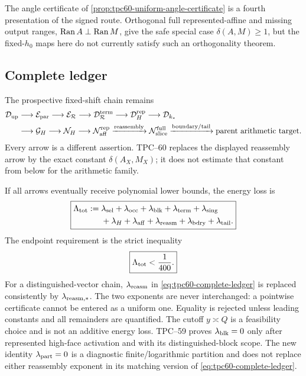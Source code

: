 The angle certificate of
\cref{prop:tpc60-uniform-angle-certificate} is a fourth presentation of the
 signed route.  Orthogonal full represented-affine and missing output
 ranges, \(\operatorname{Ran} A\perp\operatorname{Ran} M\), give the
safe special case \(\delta(A,M)\ge1\), but the fixed-\(h_0\) maps here do
not currently satisfy such an orthogonality theorem.

\subsection{Complete ledger}

The prospective fixed-shift chain remains
\begin{equation}
 \begin{aligned}
 \mathcal D_{\rm up}
 &\longrightarrow\mathcal E_{\rm par}
 \longrightarrow\mathcal E_{\mathcal R}
 \longrightarrow\mathcal D_{\mathcal R}^{\rm term}
 \longrightarrow\mathcal D_H^{\rm rep}
 \longrightarrow\mathcal D_{k_*}\\
 &\longrightarrow\mathcal G_H
 \longrightarrow\mathcal N_H
 \longrightarrow\mathcal N_{\rm aff}^{\rm rep}
 \xrightarrow{\rm reassembly}
 \mathcal N_{\rm slice}^{\rm full}
 \xrightarrow{\rm boundary/tail}
 \text{parent arithmetic target}.
 \end{aligned}
 \label{eq:tpc60-full-transfer-chain}
\end{equation}
Every arrow is a different assertion.  TPC--60 replaces the displayed
reassembly arrow by the exact constant \(\delta(A_X,M_X)\); it does not
estimate that constant from below for the arithmetic family.

If all arrows eventually receive polynomial lower bounds, the energy loss
is
\begin{equation}
 \boxed{
 \begin{aligned}
 \Lambda_{\rm tot}:={}&
 \lambda_{\rm sel}+\lambda_{\rm occ}
 +\lambda_{\rm blk}
 +\lambda_{\rm term}+\lambda_{\rm sing}\\
 &+\lambda_H+\lambda_{\rm aff}
 +\lambda_{\rm reasm}
 +\lambda_{\rm bdry}+\lambda_{\rm tail}.
 \end{aligned}}
 \label{eq:tpc60-complete-ledger}
\end{equation}
The endpoint requirement is the strict inequality
\begin{equation}
 \boxed{
 \Lambda_{\rm tot}<\frac1{400}.}
 \label{eq:tpc60-strict-endpoint}
\end{equation}
For a distinguished-vector chain, \(\lambda_{\rm reasm}\) in
\eqref{eq:tpc60-complete-ledger} is replaced consistently by
\(\lambda_{\rm reasm,*}\).  The two exponents are never interchanged: a
pointwise certificate cannot be entered as a uniform one.
Equality is rejected unless leading constants and all remainders are
quantified.  The cutoff \(y\asymp Q\) is a feasibility choice and is not an
additive energy loss.  TPC--59 proves
\(\lambda_{\rm blk}=0\) only after represented high-face activation and
with its distinguished-block scope.  The new identity
\(\lambda_{\rm part}=0\) is a diagnostic finite/logarithmic partition and
does not replace either reassembly exponent in its matching version of
\eqref{eq:tpc60-complete-ledger}.

